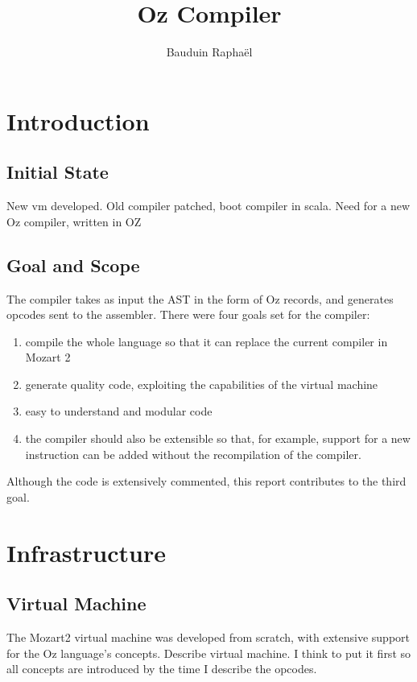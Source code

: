 \documentclass[a4paper]{memoir}
\author{Bauduin Raphaël}
\title{Oz Compiler}
\begin{document}
\lstset{language=Oz}


\ifdraftdoc
{}
\fi

\immediate{} 

\maketitle
\tableofcontents


\chapter{Introduction}
\section{Initial State}
New vm developed.
Old compiler patched, boot compiler in scala.
Need for a new Oz compiler, written in OZ

\section{Goal and Scope}
The compiler takes as input the AST in the form of Oz records, and generates opcodes sent to the assembler. 
There were four goals set for the compiler:
\begin{enumerate}
  \item compile the whole language so that it can replace the current compiler in Mozart 2
  \item generate quality code, exploiting the capabilities of the virtual machine
  \item easy to understand and modular code
  \item the compiler should also be extensible so that, for example, support for a new instruction can be added without the recompilation of the compiler.
\end{enumerate}
Although the code is extensively commented, this report contributes to the third goal.

\chapter{Infrastructure}
\section{Virtual Machine}
The Mozart2 virtual machine was developed from scratch, with extensive support for the Oz language's concepts. 
Describe virtual machine. I think to put it first so all concepts are introduced by the time I describe the opcodes.
\end{document}
